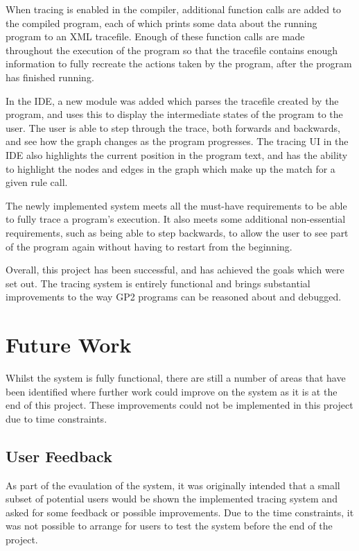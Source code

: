 \documentclass[authoryearcitations]{UoYCSproject}
\begin{document}
When tracing is enabled in the compiler, additional function calls are added to
the compiled program, each of which prints some data about the running program
to an XML tracefile. Enough of these function calls are made throughout the
execution of the program so that the tracefile contains enough information to
fully recreate the actions taken by the program, after the program has finished
running.

In the IDE, a new module was added which parses the tracefile created by the
program, and uses this to display the intermediate states of the program to the
user. The user is able to step through the trace, both forwards and backwards,
and see how the graph changes as the program progresses. The tracing UI in
the IDE also highlights the current position in the program text, and has the
ability to highlight the nodes and edges in the graph which make up the match
for a given rule call.

The newly implemented system meets all the must-have requirements to be able to
fully trace a program's execution. It also meets some additional non-essential
requirements, such as being able to step backwards, to allow the user to see
part of the program again without having to restart from the beginning.

Overall, this project has been successful, and has achieved the goals which were
set out. The tracing system is entirely functional and brings substantial
improvements to the way GP2 programs can be reasoned about and debugged.



\section{Future Work}
\label{sec:FutureWork}

Whilst the system is fully functional, there are still a number of areas that
have been identified where further work could improve on the system as it is at
the end of this project. These improvements could not be implemented in this
project due to time constraints.

\subsection{User Feedback}
\label{sec:UserFeedback}

As part of the evaulation of the system, it was originally intended that a small
subset of potential users would be shown the implemented tracing system and asked
for some feedback or possible improvements. Due to the time constraints, it was
not possible to arrange for users to test the system before the end of the project.
\end{document}
